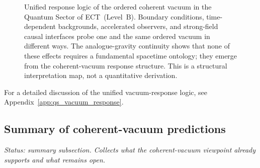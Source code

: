 \documentclass[11pt,a4paper]{article}
\numberwithin{equation}{section}
\begin{document}
\begin{figure}[h]
\centering
{}
\caption{Unified response logic of the ordered coherent vacuum
in the Quantum Sector of ECT~(Level~B).
Boundary conditions, time-dependent backgrounds, accelerated observers,
and strong-field causal interfaces probe one and the same ordered vacuum
in different ways.
The analogue-gravity continuity shows that none of these effects requires
a fundamental spacetime ontology; they emerge from the coherent-vacuum
response structure.
This is a structural interpretation map, not a quantitative derivation.}
\label{fig:qs_vacuum_unified}
\end{figure}

For a detailed discussion of the unified vacuum-response logic,
see Appendix~\ref{app:qs_vacuum_response}.

\subsection{Summary of coherent-vacuum predictions}
\label{sec:qs_vacuum_summary}

\textit{Status: summary subsection.
Collects what the coherent-vacuum viewpoint already supports and what
remains open.}
\end{document}
